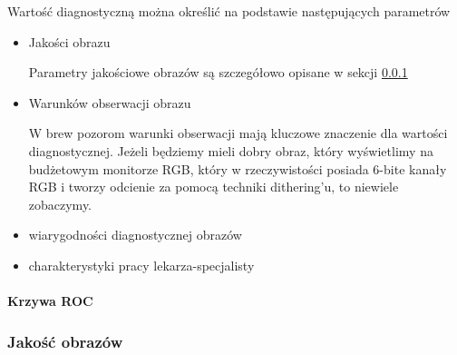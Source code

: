 Wartość diagnostyczną można określić na podstawie następujących parametrów
\begin{itemize}
    \item Jakości obrazu
    
    Parametry jakościowe obrazów są szczegółowo opisane w sekcji \ref{sec:image-quality}

    \item Warunków obserwacji obrazu

    W brew pozorom warunki obserwacji mają kluczowe znaczenie dla wartości diagnostycznej.
    Jeżeli będziemy mieli dobry obraz, który wyświetlimy na budżetowym monitorze RGB, który w rzeczywistości posiada 6-bite kanały RGB i tworzy odcienie za pomocą techniki dithering'u, to niewiele zobaczymy.

    \item wiarygodności diagnostycznej obrazów

    \item charakterystyki pracy lekarza-specjalisty

\end{itemize}

\paragraph{Krzywa ROC}

\subsubsection{Jakość obrazów}
\label{sec:image-quality}

